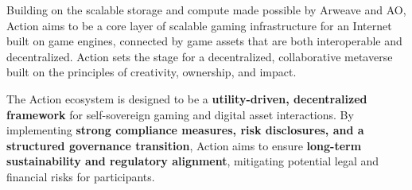 Building on the scalable storage and compute made possible by Arweave and AO, Action aims to be a core layer of scalable gaming infrastructure for an Internet built on game engines, connected by game assets that are both interoperable and decentralized. Action sets the stage for a decentralized, collaborative metaverse built on the principles of creativity, ownership, and impact.

The Action ecosystem is designed to be a \textbf{utility-driven, decentralized framework} for self-sovereign gaming and digital asset interactions. By implementing \textbf{strong compliance measures, risk disclosures, and a structured governance transition}, Action aims to ensure \textbf{long-term sustainability and regulatory alignment}, mitigating potential legal and financial risks for participants.
